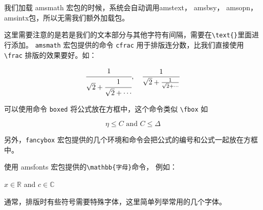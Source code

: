 	我们加载 amsmath 宏包的时候，系统会自动调用amstext， amsbsy， amsopn，
	amsintx包，所以无需我们额外加载包。

 这里需要注意的是若是我们的文本部分与其他字符有间隔，需要在\verb|\text{}|里面进行添加。
{}
\verb|amsmath| 宏包提供的命令 \verb|cfrac| 用于排版连分数，比我们直接使用 \verb|\frac| 排版的效果要好。如：
\begin{example}
\[
  \cfrac{1}{\sqrt 2 + \cfrac{1}{\sqrt 2 +\dotsb}},\quad
  \frac{1}{\sqrt 2 + \frac{1}{\sqrt 2 +\dotsb}}
\]
\end{example}




可以使用命令 \verb|boxed| 将公式放在方框中，这个命令类似 \verb|\fbox| 如
\begin{example}
\[
  \boxed{\eta \leq C \text{ and } C \leq \Delta}
\]
\end{example}

另外，\verb|fancybox| 宏包提供的几个环境和命令会把公式的编号和公式一起放在方框中。

使用 amsfonts 宏包提供的\verb|\mathbb{字母}|命令， 例如：
\begin{example}
 $x \in \mathbb{R}$ and $c \in \mathbb{C}$
\end{example}



通常，排版时有些符号需要特殊字体，这里简单列举常用的几个字体。


